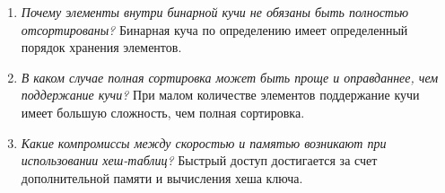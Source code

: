 \begin{enumerate}
	Cложность составляет $O(n\log_K)$, т.к. для каждого нового элемента выполняется не более одной операции над кучей размера K.
	\item \textit{Почему элементы внутри бинарной кучи не обязаны быть полностью отсортированы?}\newline
	Бинарная куча по определению имеет определенный порядок хранения элементов.
	\item \textit{В каком случае полная сортировка может быть проще и оправданнее, чем поддержание кучи?}\newline
	При малом количестве элементов поддержание кучи имеет большую сложность, чем полная сортировка.
	\item \textit{Какие компромиссы между скоростью и памятью возникают при использовании хеш-таблиц?}\newline
	Быстрый доступ достигается за счет дополнительной памяти и вычисления хеша ключа.
\end{enumerate}
